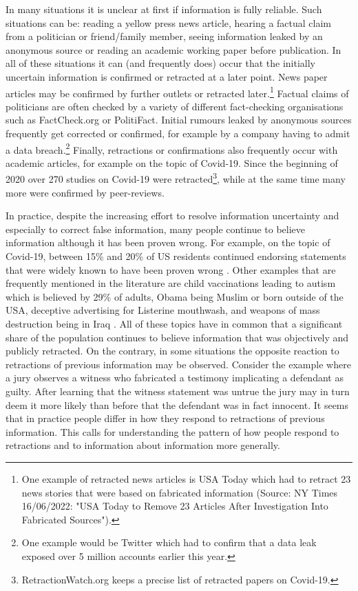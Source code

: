 \documentclass{article}
\begin{document}
In many situations it is unclear at first if information is fully reliable. Such situations can be: reading a yellow press news article, hearing a factual claim from a politician or friend/family member, seeing information leaked by an anonymous source or reading an academic working paper before publication. In all of these situations it can (and frequently does) occur that the initially uncertain information is confirmed or retracted at a later point. News paper articles may be confirmed by further outlets or retracted later.\footnote{One example of retracted news articles is USA Today which had to retract 23 news stories that were based on fabricated information (Source: NY Times 16/06/2022: "USA Today to Remove 23 Articles After Investigation Into Fabricated Sources").} Factual claims of politicians are often checked by a variety of different fact-checking organisations such as FactCheck.org or PolitiFact. Initial rumours leaked by anonymous sources frequently get corrected or confirmed, for example by a company having to admit a data breach.\footnote{One example would be Twitter which had to confirm that a data leak exposed over 5 million accounts earlier this year.} Finally, retractions or confirmations also frequently occur with academic articles, for example on the topic of Covid-19. Since the beginning of 2020 over 270 studies on Covid-19 were retracted\footnote{RetractionWatch.org keeps a precise list of retracted papers on Covid-19.}, while at the same time many more were confirmed by peer-reviews.

In practice, despite the increasing effort to resolve information uncertainty and especially to correct false information, many people continue to believe information although it has been proven wrong. For example, on the topic of Covid-19, between 15\% and 20\% of US residents continued endorsing statements that were widely known to have been proven wrong \citep{Meyer2020}. Other examples that are frequently mentioned in the literature are child vaccinations leading to autism which is believed by 29\% of adults, Obama being Muslim or born outside of the USA, deceptive advertising for Listerine mouthwash, and weapons of mass destruction being in Iraq \citep{Lewandowsky2012}. All of these topics have in common that a significant share of the population continues to believe information that was objectively and publicly retracted. On the contrary, in some situations the opposite reaction to retractions of previous information may be observed. Consider the example where a jury observes a witness who fabricated a testimony implicating a defendant as guilty. After learning that the witness statement was untrue the jury may in turn deem it more likely than before that the defendant was in fact innocent. It seems that in practice people differ in how they respond to retractions of previous information. This calls for understanding the pattern of how people respond to retractions and to information about information more generally.
\end{document}
